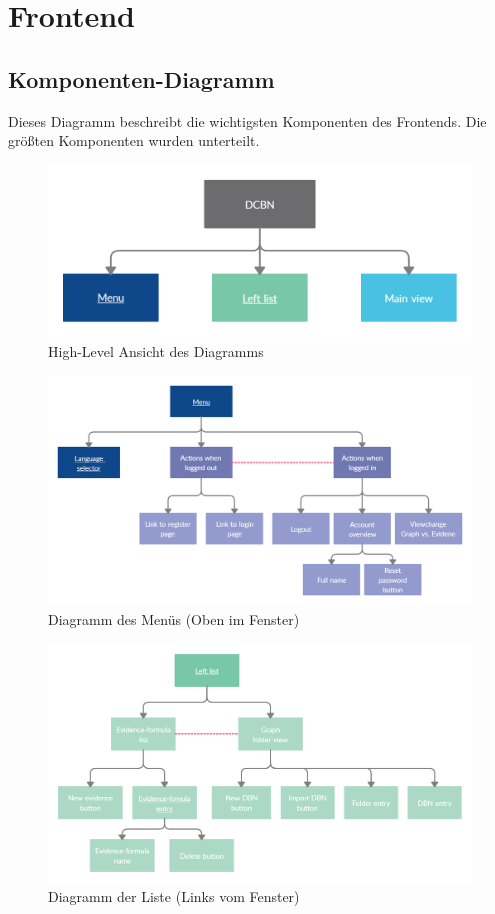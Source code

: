 \documentclass{article}
\begin{document}
\section{Frontend}
\subsection{Komponenten-Diagramm}
Dieses Diagramm beschreibt die wichtigsten Komponenten des Frontends. Die größten Komponenten wurden unterteilt.
\begin{figure}[ht!]
    \includegraphics[width=\textwidth,height=\textheight,keepaspectratio]{image/Component_Overview.png}
     \caption{High-Level Ansicht des Diagramms}
\end{figure}
\begin{figure}[ht!]
    \includegraphics[width=\textwidth,height=\textheight,keepaspectratio]{image/Component_Menu.png}
     \caption{Diagramm des Menüs (Oben im Fenster)}
\end{figure}
\begin{figure}[ht!]
    \includegraphics[width=\textwidth,height=\textheight,keepaspectratio]{image/Component_LeftList.png}
     \caption{Diagramm der Liste (Links vom Fenster)}
\end{figure}
\end{document}

